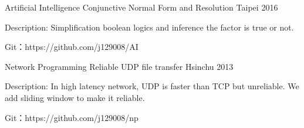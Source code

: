 
\begin{cventries}

  \cventry
    {Artificial Intelligence}
    {Conjunctive Normal Form and Resolution}
    {Taipei} %
    {2016} %
    {
      \begin{cvitems} %
        \item {Description: Simplification boolean logics and inference the factor is true or not.}
        \item {Git：https://github.com/j129008/AI}
      \end{cvitems}
    }


  \cventry
    {Network Programming}
    {Reliable UDP file transfer}
    {Hsinchu} %
    {2013} %
    {
      \begin{cvitems} %
        \item {Description: In high latency network, UDP is faster than TCP but unreliable. We add sliding window to make it reliable.}
        \item {Git：https://github.com/j129008/np}
      \end{cvitems}
    }

\end{cventries}
